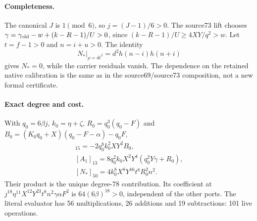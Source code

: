 \paragraph{Completeness.}
The canonical $J$ is $1\pmod6$, so $j=(J-1)/6>0$.
The source73 lift chooses
$\gamma=\gamma_{\rm old}-w+(k-R-1)/U>0$, since
$(k-R-1)/U\ge4XY/q^2>w$. Let $t=f-1>0$ and $n=i+u>0$.
The identity
\[
 \left.N_*\right|_{\rho=di^2}=d^2h(n-i)h(n+i)
\]
gives $N_*=0$, while the carrier residuals vanish. The dependence on the
retained native calibration is the same as in the source69/source73
composition, not a new formal certificate.

\paragraph{Exact degree and cost.}
With $q_0=6\beta j$, $k_0=\eta+\zeta$,
$R_0=q_0^3(q_0-F)$ and
$B_0=(K_0q_0+X)(q_0-F-\alpha)-q_0F$,
\begin{gather*}
 [A_0]_{15}=-2q_0^8k_0^2XY^2B_0,\\
 [A_1]_{13}=8q_0^2k_0X^2Y^4(q_0^2Y\gamma+R_0),\\
 [N_*]_{50}=4k_0^8X^8Y^{16}t^8R_0^2n^2.
\end{gather*}
Their product is the unique degree-78 contribution. Its coefficient at
$j^{18}\eta^{11}X^{12}Y^{23}t^8n^2\gamma\alpha F^2$
is $64(6\beta)^{18}>0$, independent of the other ports.
The literal evaluator has 56 multiplications, 26 additions and
19 subtractions: 101 live operations.
